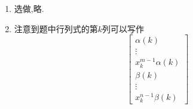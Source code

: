 \documentclass{ctexart}
\begin{document}
\begin{solution}
\begin{enumerate}[label=\tbf{(\alph*)}]
\[\begin{aligned}
        &=-\dfrac12\sum_{k=1}^{N}\left(\iPsi_0\p_k^2 D+2\p_k\iPsi_0\p_k D+D\p_k^2\iPsi_0\right)+VD\iPsi_0\\
        &=-\dfrac12\iPsi_0\sum_{k=1}^{N}\left(\p_k^2 D+2\p_k\ln\iPsi_0\p_k D\right)+D\underbrace{\left(-\dfrac{1}{2}\sum_{k=1}^{N}\p_k^2+V\right)\iPsi_0}_{\hat{H}\iPsi_0}\\
        &=\iPsi_0\left[-\dfrac12\sum_{k=1}^{N}\left(\p_k^2+2\p_k\ln\iPsi_0\p_k \right)\right]D+E(D\iPsi_0)
    \end{aligned}\]
    记
    \[\hat{\mathcal{L}}=-\dfrac12\sum_{k=1}^{N}\left(\p_k^2+2\p_k\ln\iPsi_0\p_k\right)\]
    只需证明$D$是$\hat{\mathcal{L}}$的本征态.首先
    \[\p_k\ln\iPsi_0=\p_k\left\{-\dfrac12\sum_{k=1}^{N}x_k^2-\dfrac{\theta}{2}\sum_{1\leq k<l\leq N}(x_k-x_l)^2\right\}=-x_k-\theta\sum_{k\neq l}(x_k-x_l)\]
    注意到
    \[\ln D=\sum_{k<l}\ln(x_l-x_k)\]
    于是
    \[\p_k D=D\p_k\ln D=D\sum_{k\neq l}\dfrac{1}{x_k-x_l}\]
    \[\p_k^2 D=D\left[\left(\sum_{k\neq l}\dfrac{1}{x_k-x_l}\right)^2-\sum_{k\neq l}\dfrac{1}{(x_k-x_l)^2}\right]\]
    而
    \[\sum_{k=1}^{N}\p_k^2 D=D\sum_{k=1}^{N}\sum_{l\neq k}\sum_{j\neq k}\dfrac{2}{(x_k-x_l)(x_k-x_j)}=2D\sum_{j\neq k\neq l}\dfrac{(x_j-x_l)+(x_l-x_k)+(x_k-x_j)}{(x_k-x_l)(x_l-x_j)(x_j-x_k)}=0\]
    于是二阶偏导项为零,只需考虑一阶偏导项.如此则有
    \[\begin{aligned}
        \hat{\mathcal{L}}D
        &=-\dfrac12\sum_{k=1}^{N}\left\{2\left[-x_k-\theta\sum_{k\neq l}(x_k-x_l)\right]\sum_{k\neq l}\dfrac{1}{x_k-x_l}\right\}\\
        &=D\left[(1+N\theta)\sum_{k=1}^{N}\sum_{l\neq k}\dfrac{x_k}{x_k-x_l}+\sum_{j=1}^{N}x_j\sum_{k=1}^{N}\sum_{l\neq k}\dfrac{1}{x_k-x_l}\right]\\
        &=D\left[\dfrac{(1+N\theta)N(N-1)}{2}+0\right]\\
        &=\dfrac{(1+N\theta)N(N-1)}{2}D
    \end{aligned}\]
    于是$D$确实是$\hat{\mathcal{L}}$的本征态.这样就有
    \[\hat{H}(D\iPsi_0)=\left[\dfrac{(1+N\theta)N(N-1)}{2}+E_0\right](D\iPsi_0)\]
    于是$\iPsi_F$是$\hat{H}$的本征态,其本征值为
    \[E_F=\dfrac{(1+N\theta)N(N+1)}{2}+E_0\dfrac{1+(N-1)(N\theta+1)+(1+N\theta)N(N-1)}{2}=\dfrac{1+(N^2-1)(N\theta+1)}{2}\]
    证毕.
    \item 选做,略.
    \item 注意到题中行列式的第$k$列可以写作
    \[\begin{bmatrix}
        \alpha(k)\\\vdots\\x_{k}^{m-1}\alpha(k)\\\beta(k)\\\vdots\\x_{k}^{n-1}\beta(k)

\end{bmatrix}\]
\end{enumerate}
\end{solution}
\end{document}

